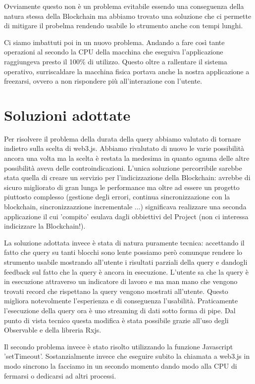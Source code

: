 Ovviamente questo non è un problema evitabile essendo una conseguenza della natura stessa della Blockchain ma abbiamo trovato una soluzione che ci permette di mitigare il probelma rendendo usabile lo strumento anche con tempi lunghi.

\vspace{0.5cm}

Ci siamo imbattuti poi in un nuovo problema. Andando a fare così tante operazioni al secondo la CPU della macchina che eseguiva l'applicazione raggiungeva presto il 100\% di utilizzo.
Questo oltre a rallentare il sistema operativo, surriscaldare la macchina fisica portava anche la nostra applicazione a freezarsi, ovvero a non rispondere più all'interazione con l'utente.

\section{Soluzioni adottate}

Per risolvere il problema della durata della query abbiamo valutato di tornare indietro sulla scelta di web3.js.
Abbiamo rivalutato di nuovo le varie possibilità ancora una volta ma la scelta è restata la medesima in quanto ognuna delle altre possibilità aveva delle controindicazioni.
L'unica soluzione percorribile sarebbe stata quella di creare un servizio per l'indicizzazione della Blockchain:
avrebbe di sicuro migliorato di gran lunga le performance ma oltre ad essere un progetto piuttosto complesso (gestione degli errori, continua sincronizzazione con la blockchain, sincronizzazzione incrementale ...)
significava realizzare una seconda applicazione il cui 'compito' esulava dagli obbiettivi del Project (non ci interessa indicizzare la Blockchain!).

La soluzione adottata invece è stata di natura puramente tecnica:
accettando il fatto che query su tanti blocchi sono lente possiamo però comunque rendere lo strumento usabile mostrando all'utente i risultati parziali della query e dandogli feedback sul fatto che la query è ancora in esecuzione.
L'utente sa che la query è in esecuzione attraverso un indicatore di lavoro e ma man mano che vengono trovati record che rispettano la query vengono mostrati all'utente. 
Questo migliora notevolmente l'esperienza e di conseguenza l'usabilità. 
Praticamente l'esecuzione della query ora è uno streaming di dati sotto forma di pipe.
Dal punto di vista tecnico questa modifica è stata possibile grazie all'uso degli Observable e della libreria Rxjs.

\vspace{0.5cm}

Il secondo problema invece è stato risolto utilizzando la funzione Javascript 'setTimeout'. 
Sostanzialmente invece che eseguire subito la chiamata a web3.js in modo sincrono la facciamo in un secondo momento dando modo alla CPU di fermarsi o dedicarsi ad altri processi.
